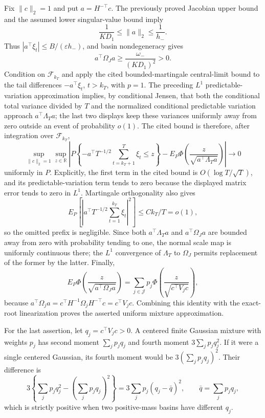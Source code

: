 Fix \(\|c\|_2=1\) and put \(a=H^{-\top}c\). The previously proved Jacobian upper bound and the assumed lower singular-value bound imply
\[
 \frac1{KD_1}\le\|a\|_2\le\frac1{h_-}.
\]
Thus \(|a^\top\xi_t|\le B/(\varepsilon h_-)\), and basin nondegeneracy gives
\[
 a^\top\Omega_Ja\ge \frac{\omega_-}{(KD_1)^2}>0.
\]
Condition on \(\mathcal F_{k_T}\) and apply the cited bounded-martingale central-limit bound to the tail differences \(-a^\top\xi_t\), \(t>k_T\), with \(p=1\). The preceding \(L^1\) predictable-variation approximation implies, by conditional Jensen, that both the conditional total variance divided by \(T\) and the normalized conditional predictable variation approach \(a^\top\Lambda_Ta\); the last two displays keep these variances uniformly away from zero outside an event of probability \(o(1)\). The cited bound is therefore, after integration over \(\mathcal F_{k_T}\),
\[
 \sup_{\|c\|_2=1}\sup_{z\in\mathbb R}
 \left|P\left\{-a^\top T^{-1/2}\sum_{t=k_T+1}^T\xi_t\le z\right\}
 -E_P\Phi\left(\frac{z}{\sqrt{a^\top\Lambda_Ta}}\right)\right|\to0
\]
uniformly in \(P\). Explicitly, the first term in the cited bound is \(O(\log T/\sqrt T)\), and its predictable-variation term tends to zero because the displayed matrix error tends to zero in \(L^1\). Martingale orthogonality also gives
\[
 E_P\left[\left|a^\top T^{-1/2}\sum_{t=1}^{k_T}\xi_t\right|^2\right]
 \le Ck_T/T=o(1),
\]
so the omitted prefix is negligible. Since both \(a^\top\Lambda_Ta\) and \(a^\top\Omega_Ja\) are bounded away from zero with probability tending to one, the normal scale map is uniformly continuous there; the \(L^1\) convergence of \(\Lambda_T\) to \(\Omega_J\) permits replacement of the former by the latter. Finally,
\[
 E_P\Phi\left(\frac{z}{\sqrt{a^\top\Omega_Ja}}\right)
 =\sum_{j\in\mathcal J}p_j\Phi\left(\frac{z}{\sqrt{c^\top V_jc}}\right),
\]
because \(a^\top\Omega_ja=c^\top H^{-1}\Omega_jH^{-\top}c=c^\top V_jc\). Combining this identity with the exact-root linearization proves the asserted uniform mixture approximation.

For the last assertion, let \(q_j=c^\top V_jc>0\). A centered finite Gaussian mixture with weights \(p_j\) has second moment \(\sum_jp_jq_j\) and fourth moment \(3\sum_jp_jq_j^2\). If it were a single centered Gaussian, its fourth moment would be \(3(\sum_jp_jq_j)^2\). Their difference is
\[
 3\left\{\sum_jp_jq_j^2-\left(\sum_jp_jq_j\right)^2\right\}
 =3\sum_jp_j(q_j-\bar q)^2,
 \qquad \bar q=\sum_jp_jq_j,
\]
which is strictly positive when two positive-mass basins have different \(q_j\).

